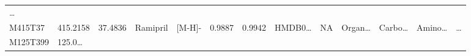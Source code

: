 \documentclass[
]{article}
\begin{document}
\begin{longtable}[]{@{}lllllllllllll@{}}
\begin{minipage}[t]{0.02\columnwidth}
\ldots{}\strut
\end{minipage}\tabularnewline
\begin{minipage}[t]{0.05\columnwidth}\raggedright
M415T37\strut
\end{minipage} & \begin{minipage}[t]{0.05\columnwidth}\raggedright
415.2158\strut
\end{minipage} & \begin{minipage}[t]{0.05\columnwidth}\raggedright
37.4836\strut
\end{minipage} & \begin{minipage}[t]{0.05\columnwidth}\raggedright
Ramipril\strut
\end{minipage} & \begin{minipage}[t]{0.05\columnwidth}\raggedright
{[}M-H{]}-\strut
\end{minipage} & \begin{minipage}[t]{0.07\columnwidth}\raggedright
0.9887\strut
\end{minipage} & \begin{minipage}[t]{0.07\columnwidth}\raggedright
0.9942\strut
\end{minipage} & \begin{minipage}[t]{0.05\columnwidth}\raggedright
HMDB0\ldots{}\strut
\end{minipage} & \begin{minipage}[t]{0.04\columnwidth}\raggedright
NA\strut
\end{minipage} & \begin{minipage}[t]{0.05\columnwidth}\raggedright
Organ\ldots{}\strut
\end{minipage} & \begin{minipage}[t]{0.05\columnwidth}\raggedright
Carbo\ldots{}\strut
\end{minipage} & \begin{minipage}[t]{0.05\columnwidth}\raggedright
Amino\ldots{}\strut
\end{minipage} & \begin{minipage}[t]{0.02\columnwidth}\raggedright
\ldots{}\strut
\end{minipage}\tabularnewline
\begin{minipage}[t]{0.05\columnwidth}\raggedright
M125T399\strut
\end{minipage} & \begin{minipage}[t]{0.05\columnwidth}\raggedright
125.0\ldots{}\strut
\end{minipage} & \begin{minipage}[t]{0.05\columnwidth}\raggedright

\end{minipage}
\end{longtable}
\end{document}
